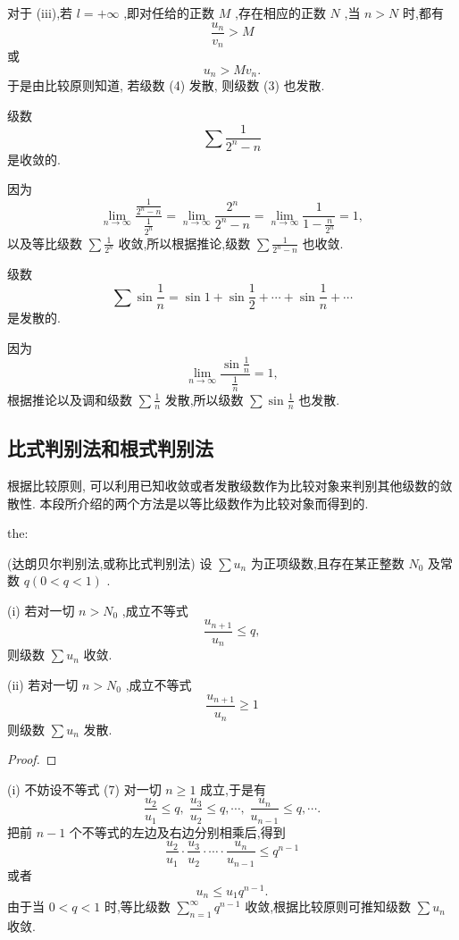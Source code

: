 对于 (iii),若 \(l =  + \infty\) ,即对任给的正数 \(M\) ,存在相应的正数 \(N\) ,当 \(n > N\) 时,都有
\[
\frac{{u}_{n}}{{v}_{n}} > M
\]
或
\[
{u}_{n} > M{v}_{n}.
\]
于是由比较原则知道, 若级数 (4) 发散, 则级数 (3) 也发散.

\begin{example}

\end{example}
级数
\[
\sum \frac{1}{{2}^{n} - n}
\]
是收敛的.

因为
\[
\mathop{\lim }\limits_{{n \rightarrow  \infty }}\frac{\frac{1}{{2}^{n} - n}}{\frac{1}{{2}^{n}}} = \mathop{\lim }\limits_{{n \rightarrow  \infty }}\frac{{2}^{n}}{{2}^{n} - n} = \mathop{\lim }\limits_{{n \rightarrow  \infty }}\frac{1}{1 - \frac{n}{{2}^{n}}} = 1,
\]
以及等比级数 \(\sum \frac{1}{{2}^{n}}\) 收敛,所以根据推论,级数 \(\sum \frac{1}{{2}^{n} - n}\) 也收敛.

\begin{example}

\end{example}
级数
\[
\sum \sin \frac{1}{n} = \sin 1 + \sin \frac{1}{2} + \cdots  + \sin \frac{1}{n} + \cdots
\]
是发散的.

因为
\[
\mathop{\lim }\limits_{{n \rightarrow  \infty }}\frac{\sin \frac{1}{n}}{\frac{1}{n}} = 1,
\]
根据推论以及调和级数 \(\sum \frac{1}{n}\) 发散,所以级数 \(\sum \sin \frac{1}{n}\) 也发散.

\subsection{比式判别法和根式判别法}

根据比较原则, 可以利用已知收敛或者发散级数作为比较对象来判别其他级数的敛散性. 本段所介绍的两个方法是以等比级数作为比较对象而得到的.

\begin{theorem}{}{the:}

\end{theorem}
 (达朗贝尔判别法,或称比式判别法) 设 \(\sum {u}_{n}\) 为正项级数,且存在某正整数 \({N}_{0}\) 及常数 \(q\left( {0 < q < 1}\right)\) .

(i) 若对一切 \(n > {N}_{0}\) ,成立不等式
\[
\frac{{u}_{n + 1}}{{u}_{n}} \leq  q, \tag{7}
\]
则级数 \(\sum {u}_{n}\) 收敛.

(ii) 若对一切 \(n > {N}_{0}\) ,成立不等式
\[
\frac{{u}_{n + 1}}{{u}_{n}} \geq  1 \tag{8}
\]
则级数 \(\sum {u}_{n}\) 发散.

\begin{proof}

\end{proof}
(i) 不妨设不等式 (7) 对一切 \(n \geq  1\) 成立,于是有
\[
\frac{{u}_{2}}{{u}_{1}} \leq  q,\;\frac{{u}_{3}}{{u}_{2}} \leq  q,\cdots ,\;\frac{{u}_{n}}{{u}_{n - 1}} \leq  q,\cdots .
\]
把前 \(n - 1\) 个不等式的左边及右边分别相乘后,得到
\[
\frac{{u}_{2}}{{u}_{1}} \cdot  \frac{{u}_{3}}{{u}_{2}} \cdot  \cdots  \cdot  \frac{{u}_{n}}{{u}_{n - 1}} \leq  {q}^{n - 1}
\]
或者
\[
{u}_{n} \leq  {u}_{1}{q}^{n - 1}.
\]
由于当 \(0 < q < 1\) 时,等比级数 \(\mathop{\sum }\limits_{{n = 1}}^{\infty }{q}^{n - 1}\) 收敛,根据比较原则可推知级数 \(\sum {u}_{n}\) 收敛.


